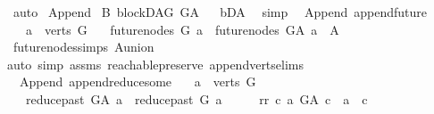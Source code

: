 \begin{isabellebody}
\ auto%
\endisatagproof
{\isafoldproof}%
%
\isadelimproof
\isanewline
%
\endisadelimproof
\isanewline
\isanewline
{}\isamarkupfalse%
\ Append\isanewline
{}\isanewline
{}\isamarkupfalse%
\ B{}{\isacharcolon}{\kern0pt}\ blockDAG\ G{\isacharunderscore}{\kern0pt}A%
\isadelimproof
\ %
\endisadelimproof
%
\isatagproof
{}\isamarkupfalse%
\ bD{\isacharunderscore}{\kern0pt}A\ \isamarkupfalse%
\ simp%
\endisatagproof
{\isafoldproof}%
%
\isadelimproof
%
\endisadelimproof
\isanewline
\isanewline
{}\isamarkupfalse%
\ {\isacharparenleft}{\kern0pt}\ Append{\isacharparenright}{\kern0pt}\ append{\isacharunderscore}{\kern0pt}future{\isacharcolon}{\kern0pt}\isanewline
\ \ \ {\isachardoublequoteopen}a\ {\isasymin}\ verts\ G{\isachardoublequoteclose}\isanewline
\ \ \ {\isachardoublequoteopen}future{\isacharunderscore}{\kern0pt}nodes\ G\ a\ {\isacharequal}{\kern0pt}\ future{\isacharunderscore}{\kern0pt}nodes\ G{\isacharunderscore}{\kern0pt}A\ a\ {\isacharminus}{\kern0pt}\ A{\isachardoublequoteclose}\isanewline
%
\isadelimproof
\ \ %
\endisadelimproof
%
\isatagproof
{}\isamarkupfalse%
\ future{\isacharunderscore}{\kern0pt}nodes{\isachardot}{\kern0pt}simps\ A{\isacharunderscore}{\kern0pt}union\isanewline
{}\isamarkupfalse%
{\isacharparenleft}{\kern0pt}auto\ simp{\isacharcolon}{\kern0pt}\ assms\ reachable{}{\isacharunderscore}{\kern0pt}preserve\ append{\isacharunderscore}{\kern0pt}verts{\isacharunderscore}{\kern0pt}elims{\isacharparenright}{\kern0pt}\ \isamarkupfalse%
%
\endisatagproof
{\isafoldproof}%
%
\isadelimproof
\isanewline
%
\endisadelimproof
\isanewline
{}\isamarkupfalse%
\ {\isacharparenleft}{\kern0pt}\ Append{\isacharparenright}{\kern0pt}\ append{\isacharunderscore}{\kern0pt}reduce{\isacharunderscore}{\kern0pt}some{\isacharcolon}{\kern0pt}\isanewline
\ \ \ {\isachardoublequoteopen}a\ {\isasymin}\ verts\ G{\isachardoublequoteclose}\isanewline
\ \ \ {\isachardoublequoteopen}reduce{\isacharunderscore}{\kern0pt}past\ G{\isacharunderscore}{\kern0pt}A\ a\ {\isacharequal}{\kern0pt}\ reduce{\isacharunderscore}{\kern0pt}past\ G\ a{\isachardoublequoteclose}\isanewline
%
\isadelimproof
%
\endisadelimproof
%
\isatagproof
{}\isamarkupfalse%
\ {\isacharminus}{\kern0pt}\isanewline
\ \ \isamarkupfalse%
\ rr{\isacharcolon}{\kern0pt}\ {\isachardoublequoteopen}{\isasymAnd}c{\isachardot}{\kern0pt}\ {\isacharparenleft}{\kern0pt}a\ {\isasymrightarrow}\isactrlsup {\isacharplus}{\kern0pt}\isactrlbsub G{\isacharunderscore}{\kern0pt}A\isactrlesub \ c{\isacharparenright}{\kern0pt}\ {\isacharequal}{\kern0pt}\ {\isacharparenleft}{\kern0pt}a\ {\isasymrightarrow}\isactrlsup {\isacharplus}{\kern0pt}\ c{\isacharparenright}{\kern0pt}{\isachardoublequoteclose}\ \isamarkupfalse%

\end{isabellebody}
